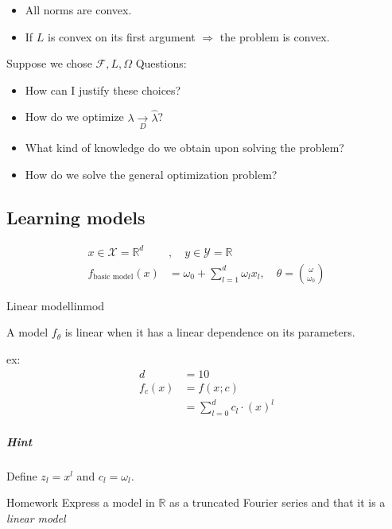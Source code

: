 \begin{itemize}
	\item All norms are convex.
	\item If $L$ is convex on its first argument $\Rightarrow$ the problem is convex.
\end{itemize}

Suppose we chose $\mathcal{F}, L, \Omega$ Questions:

\begin{itemize}
	\item How can I justify these choices?
	\item How do we optimize $\lambda \xrightarrow[D]{} \hat\lambda$?
	\item What kind of knowledge do we obtain upon solving the problem?
	\item How do we solve the general optimization problem?
\end{itemize}

\subsection{Learning models} %

\begin{align*}
	x \in \mathcal{X} = \mathbb{R}^d & , \quad y \in \mathcal{Y} = \mathbb{R}                                            \\
	f_{\text{basic model}}(x)        & = \omega_0 + \sum_{l = 1}^d \omega_l x_l, \quad \theta = \binom{\omega}{\omega_0}
\end{align*}

\begin{definition}{Linear model}{linmod}

A model $f_\theta$ is linear when it has a linear dependence on its parameters.

ex:
\begin{align*}
	d      & = 10                           \\
	f_c(x) & = f(x;c)                       \\
	       & = \sum_{l=0}^d c_l \cdot (x)^l
\end{align*}
\end{definition}

\subparagraph{Hint} Define $z_l = x^l$ and $c_l = \omega_l$.

\begin{exercise}{Homework}{}
Express a model in $\mathds{R}$ as a truncated Fourier series and
that it is a \emph{linear model}
\end{exercise}

